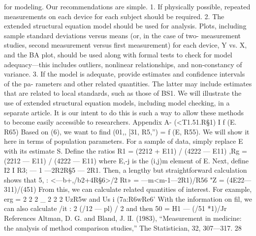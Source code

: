 for modeling.
Our recommendations are simple.
1. If physically possible, repeated measurements on each device for each subject
should be required.
2. The extended structural equation model should be used for analysis. Plots,
including sample standard deviations versus means (or, in the case of two-
measurement studies, second measurement versus ﬁrst measurement) for each
device, Y vs. X, and the BA plot, should be used along with formal tests to
check for model adequacy—this includes outliers, nonlinear relationships, and
non-constancy of variance.
3. If the model is adequate, provide estimates and conﬁdence intervals of the pa-
rameters and other related quantities. The latter may include estimates that
are related to local standards, such as those of BS1.
We will illustrate the use of extended structural equation models, including model
checking, in a separate article. It is our intent to do this is such a way to allow these
methods to become easily accessible to researchers.
Appendix A- (<T1.51.R§1) I f (E. R65)
Based on (6), we want to ﬁnd (01,, [31, R5,”) = f (E, R55). We will show it here in terms
of population parameters. For a sample of data, simply replace E with its estimate
S.
Deﬁne the ratios R1 = (2212 + E11) / (4222 — E11) ,Rg = (2212 — E11) / (4222 — E11)
where E,-j is the (i,j)m element of E. Next, deﬁne I2 I R3; — 1 —2R2R§5 — 2R1. Then,
a lengthy but straightforward calculation shows that
5, : <—b+,/b2+4R§6>/2
Rt» = —m<m-1—2R1)/R56
"Z = (4E22—311)/(451)
From this, we can calculate related quantities of interest. For example, erg =
2 2 2 _ 2 2 2
UzR5w and Us i (7a:R6wRe6'
With the information on ﬁl, we can also calculate /it : 2 (/12 — pl) / 2 and then
50 = H1 — (/51 *1)/Jr
References
Altman, D. G. and Bland, J. l\/I. (1983), “Measurement in medicine: the analysis
of method comparison studies,” The Statistician, 32, 307—317.
28



